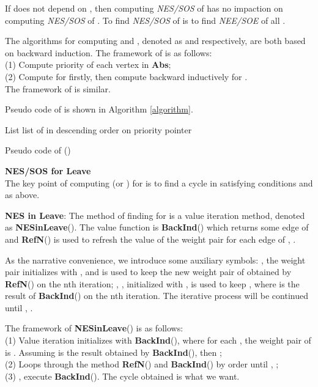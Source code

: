 \documentclass{acm_proc_article-sp}
\begin{document}
If  does not depend on , then computing \textit{NES/SOS} of  has no impaction on computing \textit{NES/SOS} of . To find \textit{NES/SOS} of  is to find \textit{NEE/SOE} of all .

The algorithms for computing  and , denoted as  and  respectively, are both based on backward induction. The framework of  is as follows:\\
(1) Compute priority of each vertex  in \textbf{Abs};\\
(2) Compute  for  firstly, then compute backward inductively for .\\
The framework of  is similar.

Pseudo code of  is shown in Algorithm \ref{algorithm}.

\begin{algorithm}[h]
\scriptsize
 \;
 List  list of  in descending order on priority\;
 pointer \;
 \caption{Pseudo code of ()}
 \label{algorithm}
\end{algorithm}

\textbf{NES/SOS for Leave}\\
The key point of computing  (or ) for   is to find a cycle in  satisfying conditions  and  as above.

\textbf{NES in Leave}: The method of finding  for   is a value iteration method, denoted as \textbf{NESinLeave}(). The value function is \textbf{BackInd}() which returns some edge  of  and \textbf{RefN}() is used to refresh the value of the weight pair for each edge of , .

As the narrative convenience, we introduce some auxiliary symbols: , the weight pair initializes with , and  is used to keep the new weight pair of  obtained by \textbf{RefN}() on the nth iteration; , , initialized with , is used to keep , where  is the result of \textbf{BackInd}() on the nth iteration. The iterative process will be continued until , .

The framework of \textbf{NESinLeave}() is as follows:\\
(1) Value iteration initializes with \textbf{BackInd}(), where for each , the weight pair of  is . Assuming  is the result obtained by \textbf{BackInd}(), then ;\\
(2) Loops through the method \textbf{RefN}() and \textbf{BackInd}() by order until , ;\\
(3) , execute \textbf{BackInd}(). The cycle obtained is what we want.
\end{document}
